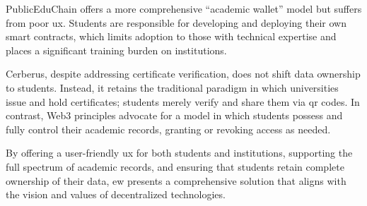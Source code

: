 PublicEduChain offers a more comprehensive “academic wallet” model but suffers from poor \gls{ux}. Students are responsible for developing and deploying their own smart contracts, which limits adoption to those with technical expertise and places a significant training burden on institutions.

Cerberus, despite addressing certificate verification, does not shift data ownership to students. Instead, it retains the traditional paradigm in which universities issue and hold certificates; students merely verify and share them via \gls{qr} codes. In contrast, Web3 principles advocate for a model in which students possess and fully control their academic records, granting or revoking access as needed.

By offering a user-friendly \gls{ux} for both students and institutions, supporting the full spectrum of academic records, and ensuring that students retain complete ownership of their data, \gls{ew} presents a comprehensive solution that aligns with the vision and values of decentralized technologies.


